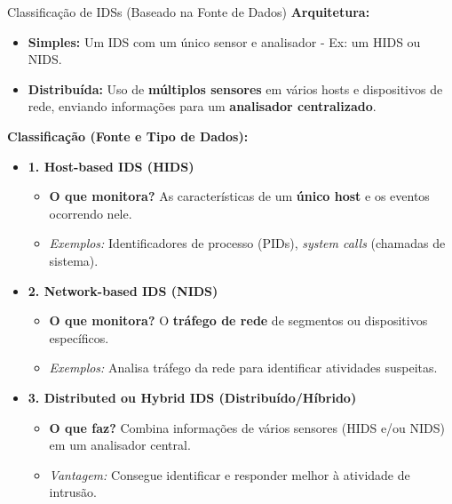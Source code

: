 \begin{frame}{Classificação de IDSs (Baseado na Fonte de Dados)}
    \textbf{Arquitetura:}


    \begin{itemize}
        \item \textbf{Simples:} Um IDS com um único sensor e analisador - Ex:  um HIDS ou  NIDS.
        \item \textbf{Distribuída:} Uso de \textbf{múltiplos sensores} em vários hosts e dispositivos de rede, enviando informações para um \textbf{analisador centralizado}.
    \end{itemize}

    \textbf{Classificação (Fonte e Tipo de Dados):}
    \begin{itemize}
        \item \textbf{1. Host-based IDS (HIDS)}
              \begin{itemize}
                  \item \textbf{O que monitora?} As características de um \textbf{único host} e os eventos ocorrendo nele.
                  \item \textit{Exemplos:} Identificadores de processo (PIDs), \textit{system calls} (chamadas de sistema).
              \end{itemize}

        \item \textbf{2. Network-based IDS (NIDS)}
              \begin{itemize}
                  \item \textbf{O que monitora?} O \textbf{tráfego de rede} de segmentos ou dispositivos específicos.
                  \item \textit{Exemplos:} Analisa tráfego da rede para identificar atividades suspeitas.
              \end{itemize}

        \item \textbf{3. Distributed ou Hybrid IDS (Distribuído/Híbrido)}
              \begin{itemize}
                  \item \textbf{O que faz?} Combina informações de vários sensores (HIDS e/ou NIDS) em um analisador central.
                  \item \textit{Vantagem:} Consegue identificar e responder melhor à atividade de intrusão.
              \end{itemize}
    \end{itemize}
\end{frame}

